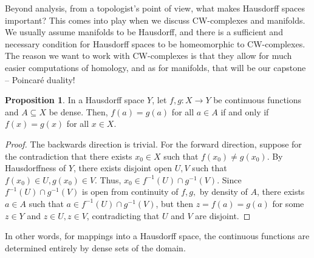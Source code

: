 \documentclass[12pt,reqno]{amsart}
\numberwithin{theorem}{section}
\theoremstyle{definition}
\theoremstyle{remark}
\numberwithin{equation}{section}
\theoremstyle{definition}
\newtheorem{prop}[theorem]{Proposition}
\begin{document}
Beyond analysis, from a topologist's point of view, what makes Hausdorff spaces important? This comes into play when we discuss CW-complexes and manifolds. We usually assume manifolds to be Hausdorff, and there is a sufficient and necessary condition for Hausdorff spaces to be homeomorphic to CW-complexes. The reason we want to work with CW-complexes is that they allow for much easier computations of homology, and as for manifolds, that will be our capstone -- Poincaré duality!
\begin{prop}
    In a Hausdorff space $Y$, let $f,g:X \rightarrow Y$ be continuous functions and $A\subseteq X$ be dense. Then, $f(a)=g(a)$ for all $a \in A$ if and only if $f(x)=g(x)$ for all $x \in X$. 
\end{prop}
\begin{proof}
    The backwards direction is trivial. For the forward direction,
     suppose for the contradiction that there exists $x_0 \in X$ such that $f(x_0)\neq g(x_0)$. By Hausdorffness of $Y$, there exists disjoint open $U,V$ such that $f(x_0) \in U,g(x_0) \in V$. Thus, $x_0 \in f^{-1}(U) \cap g^{-1}(V)$. Since $f^{-1}(U) \cap g^{-1}(V)$ is open from continuity of $f,g,$ by density of $A$, there exists $a \in A$ such that $a \in f^{-1}(U) \cap g^{-1}(V)$, but then $z=f(a)=g(a)$ for some $z\in Y$ and $z \in U, z \in V$, contradicting that $U$ and $V$ are disjoint.
\end{proof}
In other words, for mappings into a Hausdorff space, the continuous functions are determined entirely by dense sets of the domain.
\end{document}
